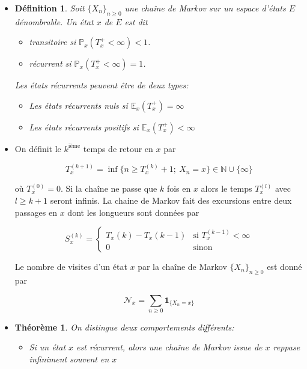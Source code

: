 \documentclass[10pt,a4paper,oneside]{article}
\newtheorem{theoreme}{Théorème}
\newtheorem{definition}{Définition}
\begin{document}
\begin{itemize}

\item
\begin{definition}
Soit $\{ X_n \}_{n \geq 0}$ une chaîne de Markov sur un espace d'états $E$ dénombrable. Un état $x$ de $E$ est dit

\begin{itemize}
\item
transitoire si $\mathbb{P}_x(T_x^+ < \infty) < 1$.
\item
récurrent si $\mathbb{P}_x(T_x^+ < \infty) = 1$.
\end{itemize}

Les états récurrents peuvent être de deux types:

\begin{itemize}
\item
Les états récurrents nuls si $\mathbb{E}_x(T_x^+) = \infty$
\item
Les états récurrents positifs si $\mathbb{E}_x(T_x^+) < \infty$
\end{itemize}
\end{definition}

\item
On définit le $k^{\text{ième}}$ temps de retour en $x$ par

\[ T_x^{(k + 1)} = \inf \{ n \geq T_x^{(k)} + 1;\ X_n = x \} \in \mathbb{N} \cup \{ \infty \} \]

où $T_x^{(0)} = 0$. Si la chaîne ne passe que $k$ fois en $x$ alors le temps $T_x^(l)$ avec $l \geq k + 1$ seront infinis. La chaine de Markov fait des excursions entre deux passages en $x$ dont les longueurs sont données par

\[ S_x^{(k)} = \begin{cases}
T_x(k) - T_x(k - 1) & \text{si } T_x^{(k - 1)} < \infty \\
0 & \text{sinon}
\end{cases} \]

Le nombre de visites d'un état $x$ par la chaîne de Markov $\{ X_n \}_{n \geq 0}$ est donné par

\[ \mathcal{N}_x = \sum_{n \geq 0} \textbf{1}_{ \{ X_n = x \} } \]

\item
\begin{theoreme}
On distingue deux comportements différents:

\begin{itemize}
\item
Si un état $x$ est récurrent, alors une chaîne de Markov issue de $x$ reppase infiniment souvent en $x$


\end{itemize}
\end{theoreme}
\end{itemize}
\end{document}
